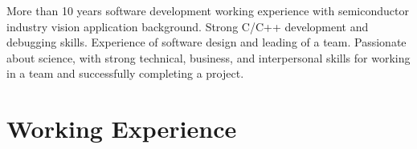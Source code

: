 \documentclass[11pt,a4paper,sans]{moderncv}        %
\begin{document}
\makecvtitle

\small{More than 10 years software development working experience with semiconductor industry vision application background. Strong C/C++ development and debugging skills. Experience of software design and leading of a team. Passionate about science, with strong technical, business, and interpersonal skills for working in a team and successfully completing a project.}

\section{Working Experience}

\vspace{6pt}
\end{document}

